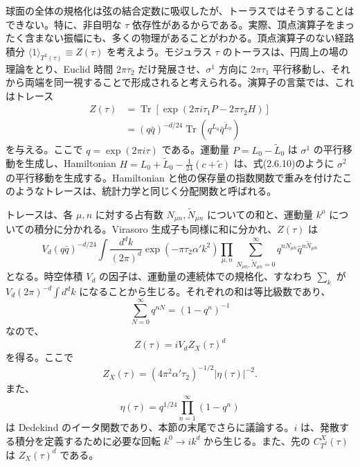 
球面の全体の規格化は弦の結合定数に吸収したが、トーラスではそうすることはできない。特に、非自明な $\tau$ 依存性があるからである。実際、頂点演算子をまったく含まない振幅にも、多くの物理があることがわかる。頂点演算子のない経路積分 $\langle1\rangle_{T^2(\tau)}\equiv Z(\tau)$ を考えよう。モジュラス $\tau$ のトーラスは、円周上の場の理論をとり、Euclid 時間 $2\pi\tau_2$ だけ発展させ、$\sigma^1$ 方向に $2\pi\tau_1$ 平行移動し、それから両端を同一視することで形成されると考えられる。演算子の言葉では、これはトレース
\begin{equation}
\begin{aligned}
Z(\tau)&=\operatorname{Tr}\left[\exp(2\pi i\tau_1P-2\pi\tau_2H)\right]\\
&=(q\bar q)^{-d/24}\operatorname{Tr}\left(q^{L_0}\bar q^{\tilde L_0}\right)
\end{aligned}
\tag{7.2.5}\label{eq:7.2.5}
\end{equation}
を与える。ここで $q=\exp(2\pi i\tau)$ である。運動量 $P=L_0-\tilde L_0$ は $\sigma^1$ の平行移動を生成し、Hamiltonian $H=L_0+\tilde L_0-\tfrac1{24}(c+\tilde c)$ は、式(2.6.10)のように $\sigma^2$ の平行移動を生成する。Hamiltonian と他の保存量の指数関数で重みを付けたこのようなトレースは、統計力学と同じく分配関数と呼ばれる。

トレースは、各 $\mu,n$ に対する占有数 $N_{\mu n},\tilde N_{\mu n}$ についての和と、運動量 $k^\mu$ についての積分に分かれる。Virasoro 生成子も同様に和に分かれ、$Z(\tau)$ は
\begin{equation}
V_d(q\bar q)^{-d/24}\int\frac{d^dk}{(2\pi)^d}
\exp(-\pi\tau_2\alpha'k^2)
\prod_{\mu,n}\sum_{N_{\mu n},\tilde N_{\mu n}=0}^{\infty}
q^{nN_{\mu n}}\bar q^{n\tilde N_{\mu n}}
\tag{7.2.6}\label{eq:7.2.6}
\end{equation}
となる。時空体積 $V_d$ の因子は、運動量の連続体での規格化、すなわち $\sum_k$ が $V_d(2\pi)^{-d}\int d^dk$ になることから生じる。それぞれの和は等比級数であり、
\begin{equation}
\sum_{N=0}^{\infty}q^{nN}=(1-q^n)^{-1}
\tag{7.2.7}\label{eq:7.2.7}
\end{equation}
なので、
\begin{equation}
Z(\tau)=iV_dZ_X(\tau)^d
\tag{7.2.8}\label{eq:7.2.8}
\end{equation}
を得る。ここで
\begin{equation}
Z_X(\tau)=(4\pi^2\alpha'\tau_2)^{-1/2}|\eta(\tau)|^{-2}.
\tag{7.2.9}\label{eq:7.2.9}
\end{equation}
また、
\begin{equation}
\eta(\tau)=q^{1/24}\prod_{n=1}^{\infty}(1-q^n)
\tag{7.2.10}\label{eq:7.2.10}
\end{equation}
は Dedekind のイータ関数であり、本節の末尾でさらに議論する。$i$ は、発散する積分を定義するために必要な回転 $k^0\to ik^d$ から生じる。また、先の $C_{T^2}^{X}(\tau)$ は $Z_X(\tau)^d$ である。

